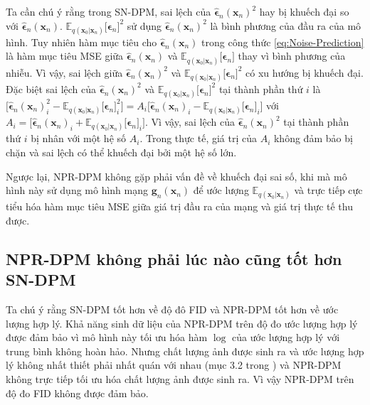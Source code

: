 \documentclass[14pt, a4paper]{article}
\numberwithin{equation}{section}
\numberwithin{figure}{section}
\numberwithin{dl}{section}
\numberwithin{md}{section}
\numberwithin{bd}{section}
\numberwithin{dn}{section}
\numberwithin{hq}{section}
\begin{document}
    Ta cần chú ý rằng trong SN-DPM, sai lệch của $\hat{\boldsymbol{\epsilon}}_n(\boldsymbol{x}_n)^2$ hay bị khuếch đại so với $\hat{\boldsymbol{\epsilon}}_n(\boldsymbol{x}_n)$.
    $\mathbb{E}_{q(\boldsymbol{x}_0 \vert \boldsymbol{x}_n)} \lbrack \boldsymbol{\epsilon}_n \rbrack^2$ sử dụng $\hat{\boldsymbol{\epsilon}}_n (\boldsymbol{x}_n)^2$ là bình phương của đầu ra của mô hình.
    Tuy nhiên hàm mục tiêu cho $\hat{\boldsymbol{\epsilon}}_n (\boldsymbol{x}_n)$ trong công thức \ref{eq:Noise-Prediction} là hàm mục tiêu MSE giữa $\hat{\boldsymbol{\epsilon}}_n (\boldsymbol{x}_n)$ và $\mathbb{E}_{q(\boldsymbol{x}_0 \vert \boldsymbol{x}_n)} \lbrack \boldsymbol{\epsilon}_n \rbrack$ thay vì bình phương của nhiễu.
    Vì vậy, sai lệch giữa $\hat{\boldsymbol{\epsilon}}_n(\boldsymbol{x}_n)^2$ và $\mathbb{E}_{q(\boldsymbol{x}_0 \vert \boldsymbol{x}_n)} \lbrack \boldsymbol{\epsilon}_n \rbrack^2$ có xu hướng bị khuếch đại.
    Đặc biệt sai lệch của $\hat{\boldsymbol{\epsilon}}_n(\boldsymbol{x}_n)^2$ và $\mathbb{E}_{q(\boldsymbol{x}_0 \vert \boldsymbol{x}_n)} \lbrack \boldsymbol{\epsilon}_n \rbrack^2$ tại thành phần thứ $i$ là $\big \lbrack \hat{\boldsymbol{\epsilon}}_n(\boldsymbol{x}_n)_i^2 - \mathbb{E}_{q(\boldsymbol{x}_0 \vert \boldsymbol{x}_n)} \lbrack \boldsymbol{\epsilon}_n \rbrack_i^2 \big \rbrack=A_i \big \lbrack \hat{\boldsymbol{\epsilon}}_n(\boldsymbol{x}_n)_i - \mathbb{E}_{q(\boldsymbol{x}_0 \vert \boldsymbol{x}_n)} \lbrack \boldsymbol{\epsilon}_n \rbrack_i \big \rbrack$ với $A_i = \big \lbrack \hat{\boldsymbol{\epsilon}}_n(\boldsymbol{x}_n)_i + \mathbb{E}_{q(\boldsymbol{x}_0 \vert \boldsymbol{x}_n)} \lbrack \boldsymbol{\epsilon}_n \rbrack_i \big \rbrack$.
    Vì vậy, sai lệch của $\hat{\boldsymbol{\epsilon}}_n(\boldsymbol{x}_n)^2$ tại thành phần thứ $i$ bị nhân với một hệ số $A_i$.
    Trong thực tế, giá trị của $A_i$ không đảm bảo bị chặn và sai lệch có thể khuếch đại bởi một hệ số lớn.

    Ngược lại, NPR-DPM không gặp phải vấn đề về khuếch đại sai số, khi mà mô hình này sử dụng mô hình mạng $\boldsymbol{g}_n (\boldsymbol{x}_n)$ để ước lượng $\mathbb{E}_{q(\boldsymbol{x}_0 \vert \boldsymbol{x}_n)}$ và trực tiếp cực tiểu hóa hàm mục tiêu MSE giữa giá trị đầu ra của mạng và giá trị thực tế thu được.

    \subsection{NPR-DPM không phải lúc nào cũng tốt hơn SN-DPM}

    Ta chú ý rằng SN-DPM tốt hơn về độ đô FID và NPR-DPM tốt hơn về ước lượng hợp lý.
    Khả năng sinh dữ liệu của NPR-DPM trên độ đo ước lượng hợp lý được đảm bảo vì mô hình này tối ưu hóa hàm $\log$ của ước lượng hợp lý với trung bình không hoàn hảo.
    Nhưng chất lượng ảnh được sinh ra và ước lượng hợp lý không nhất thiết phải nhất quán với nhau (mục 3.2 trong \cite{theis2016note}) và NPR-DPM không trực tiếp tối ưu hóa chất lượng ảnh được sinh ra.
    Vì vậy NPR-DPM trên độ đo FID không được đảm bảo.
\end{document}

